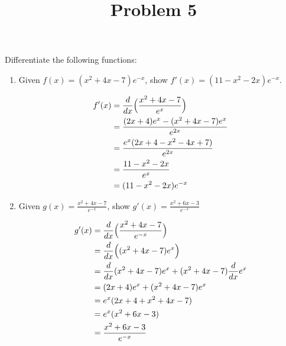 \documentclass{ximera}
\title[Problem 5]{Problem 5}
\begin{document}
\begin{abstract} \end{abstract}
\maketitle


\begin{problem}
Differentiate the following functions:

	\begin{enumerate}
	
	\item  Given $f(x) = (x^2 + 4x - 7) e^{-x}$, show $f'(x)= (11-x^2 -2x) e^{-x}$.
\begin{explanation}
			\begin{align*}
			f'(x) &= \dfrac{d}{dx} \Bigl(\frac{x^2 + 4x - 7}{e^{x}}\Bigr)  \\
			&= \frac{(2x+4)e^{x}-(x^2 + 4x - 7)e^{x}}{e^{2x}} \\
			&= \frac{e^{x}(2x + 4-x^2 - 4x + 7)}{e^{2x}} \\ 
			&=  \frac{11-x^2 - 2x }{e^{x}} \\ 
			&=(11-x^2 -2x) e^{-x}
			\end{align*}
			\end{explanation}
			
			
			
	\item  Given $g(x) = \frac{x^2 + 4x - 7}{e^{-x}}$, show $g'(x)=\frac{x^2 + 6x - 3}{e^{-x}}$
\begin{explanation}
			\begin{align*}
			g'(x) &=  \dfrac{d}{dx} \Bigl(\frac{x^2 + 4x - 7}{e^{-x}}\Bigr)  \\
			&= \dfrac{d}{dx} \Bigl((x^2 + 4x - 7)e^{x} \Bigr) \\
			&= \dfrac{d}{dx}(x^2 + 4x - 7)e^{x} +(x^2 + 4x - 7)\dfrac{d}{dx} e^{x}\\
			&=(2x+4)e^{x}+(x^2 + 4x - 7)e^{x}\\
			&=e^{x}(2x+4+x^2 + 4x - 7)\\
			&=e^{x}(x^2 + 6x - 3)\\
			&=\frac{x^2 + 6x - 3}{e^{-x}}\\
			\end{align*}
			\end{explanation}
			
	\end{enumerate}		
\end{problem}
\end{document}
